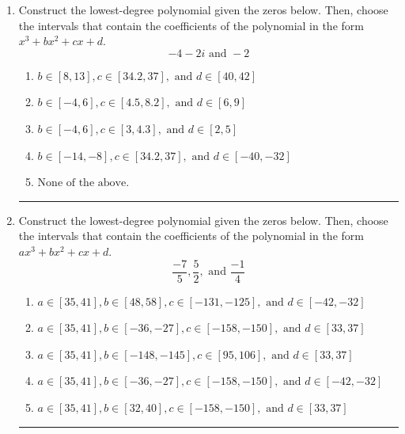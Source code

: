 \documentclass[14pt]{extbook}
\newcommand{\litem}[1]{\item#1\hspace*{-1cm}\rule{\textwidth}{0.4pt}}
\begin{document}
\begin{enumerate}
{\begin{enumerate}[label=\Alph*.]
\end{enumerate} }
\litem{
Construct the lowest-degree polynomial given the zeros below. Then, choose the intervals that contain the coefficients of the polynomial in the form $x^3+bx^2+cx+d$.\[ -4 - 2 i \text{ and } -2 \]\begin{enumerate}[label=\Alph*.]
\item \( b \in [8, 13], c \in [34.2, 37], \text{ and } d \in [40, 42] \)
\item \( b \in [-4, 6], c \in [4.5, 8.2], \text{ and } d \in [6, 9] \)
\item \( b \in [-4, 6], c \in [3, 4.3], \text{ and } d \in [2, 5] \)
\item \( b \in [-14, -8], c \in [34.2, 37], \text{ and } d \in [-40, -32] \)
\item \( \text{None of the above.} \)

\end{enumerate} }
\litem{
Construct the lowest-degree polynomial given the zeros below. Then, choose the intervals that contain the coefficients of the polynomial in the form $ax^3+bx^2+cx+d$.\[ \frac{-7}{5}, \frac{5}{2}, \text{ and } \frac{-1}{4} \]\begin{enumerate}[label=\Alph*.]
\item \( a \in [35, 41], b \in [48, 58], c \in [-131, -125], \text{ and } d \in [-42, -32] \)
\item \( a \in [35, 41], b \in [-36, -27], c \in [-158, -150], \text{ and } d \in [33, 37] \)
\item \( a \in [35, 41], b \in [-148, -145], c \in [95, 106], \text{ and } d \in [33, 37] \)
\item \( a \in [35, 41], b \in [-36, -27], c \in [-158, -150], \text{ and } d \in [-42, -32] \)
\item \( a \in [35, 41], b \in [32, 40], c \in [-158, -150], \text{ and } d \in [33, 37] \)


\end{enumerate}}
\end{enumerate}
\end{document}
